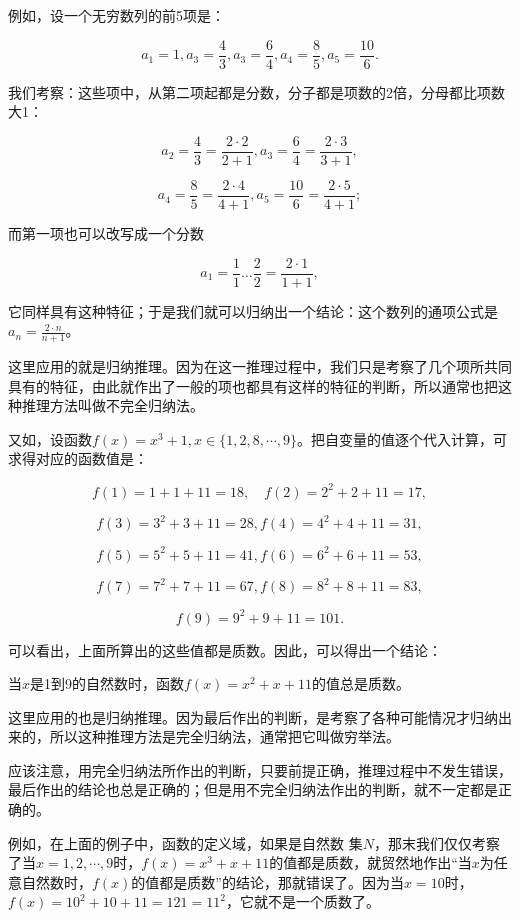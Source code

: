 例如，设一个无穷数列的前5项是：

\[
a_{1} = 1, a_{3} = \frac{4}{3}, a_{3} = \frac{6}{4}, a_{4} = \frac{8}{5}, a_{5} = \frac{10}{6}.
\]

我们考察：这些项中，从第二项起都是分数，分子都是项数的2倍，分母都比项数大1：

\[
a_{2} = \frac{4}{3} = \frac{2 \cdot 2}{2 + 1}, a_{3} = \frac{6}{4} = \frac{2 \cdot 3}{3 + 1},
\]

\[
a_{4} = \frac{8}{5} = \frac{2 \cdot 4}{4 + 1}, a_{5} = \frac{10}{6} = \frac{2 \cdot 5}{4 + 1};
\]

而第一项也可以改写成一个分数

\[
a_{1} = \frac{1}{1} \dots \frac{2}{2} = \frac{2 \cdot 1}{1 + 1},
\]

它同样具有这种特征；于是我们就可以归纳出一个结论：这个数列的通项公式是\(a_{n} = \frac{2 \cdot n}{n + 1}\)。

这里应用的就是归纳推理。因为在这一推理过程中，我们只是考察了几个项所共同具有的特征，由此就作出了一般的项也都具有这样的特征的判断，所以通常也把这种推理方法叫做不完全归纳法。

又如，设函数\(f(x) = x^3 + 1, x \in \{1, 2, 8, \cdots, 9\}\)。把自变量的值逐个代入计算，可求得对应的函数值是：

\[
f (1) = 1 + 1 + 11 = 18, \quad f (2) = 2^{2} + 2 + 11 = 17,
\]

\[
f (3) = 3^2+3+11 = 28, f (4) = 4^{2} + 4 + 11 = 31,
\]

\[
f (5) = 5^2+5+11 = 41, f(6)=6^2+6+11 = 53,
\]

\[
f (7) = 7^{2} + 7 + 11 = 67, f (8) = 8^{2} + 8 + 11 = 83,
\]

\[
f (9) = 9^2+9+11 = 101.
\]

可以看出，上面所算出的这些值都是质数。因此，可以得出一个结论：

当\(x\)是1到9的自然数时，函数\(f(x) = x^2 + x + 11\)的值总是质数。

这里应用的也是归纳推理。因为最后作出的判断，是考察了各种可能情况才归纳出来的，所以这种推理方法是完全归纳法，通常把它叫做穷举法。

应该注意，用完全归纳法所作出的判断，只要前提正确，推理过程中不发生错误，最后作出的结论也总是正确的；但是用不完全归纳法作出的判断，就不一定都是正确的。

例如，在上面的例子中，函数的定义域，如果是自然数
集\(N\)，那末我们仅仅考察了当\(x = 1, 2, \cdots, 9\)时，\(f(x) = x^3 + x + 11\)的值都是质数，就贸然地作出``当\(x\)为任意自然数时，\(f(x)\)的值都是质数''的结论，那就错误了。因为当\(x = 10\)时，\(f(x) = 10^2 + 10 + 11 = 121 = 11^2\)，它就不是一个质数了。

